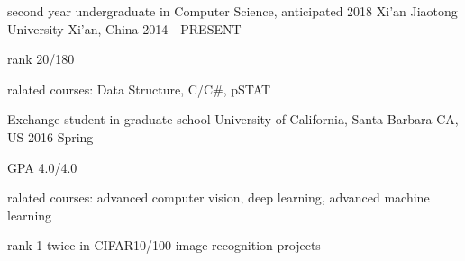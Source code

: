 

\begin{cventries}

  \cventry
    {second year undergraduate in Computer Science, anticipated 2018} %
    {Xi'an Jiaotong University} %
    {Xi'an, China} %
    {2014 - PRESENT} %
    {
      \begin{cvitems} %
        \item {rank 20/180}
        \item {ralated courses: Data Structure, C/C\#, pSTAT}
      \end{cvitems}
    }
    
  \cventry
    {Exchange student in graduate school} %
    {University of California, Santa Barbara} %
    {CA, US} %
    {2016 Spring} %
    {
      \begin{cvitems} %
        \item {GPA 4.0/4.0}
        \item {ralated courses: advanced computer vision, deep learning, advanced machine learning}
        \item {rank 1 twice in CIFAR10/100 image recognition projects}
      \end{cvitems}
    }

\end{cventries}
